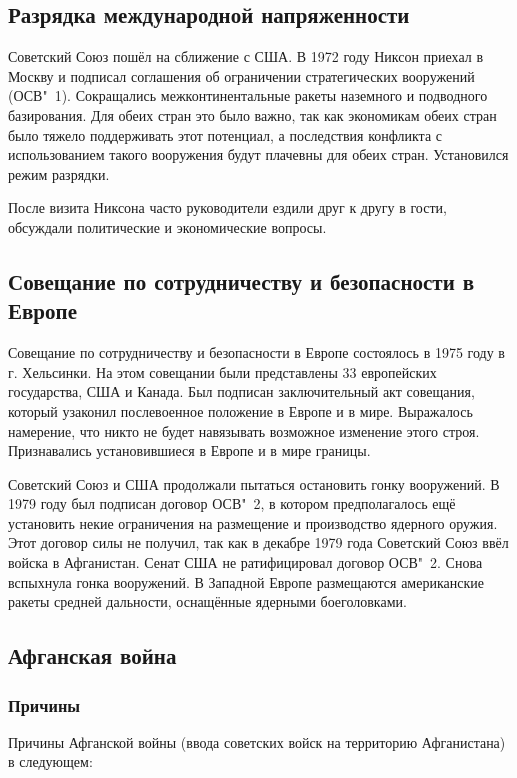     \subsection{Разрядка международной напряженности}
    
    Советский Союз пошёл на сближение с США. В 1972 году Никсон приехал в Москву и подписал соглашения об ограничении стратегических вооружений (ОСВ"~1). Сокращались межконтинентальные ракеты наземного и подводного базирования. Для обеих стран это было важно, так как экономикам обеих стран было тяжело поддерживать этот потенциал, а последствия конфликта с использованием такого вооружения будут плачевны для обеих стран. Установился режим разрядки.
    
    После визита Никсона часто руководители ездили друг к другу в гости, обсуждали политические и экономические вопросы.

    \subsection{Совещание по сотрудничеству и безопасности в Европе}
    
    Совещание по сотрудничеству и безопасности в Европе состоялось в 1975 году в г. Хельсинки. На этом совещании были представлены 33 европейских государства, США и Канада. Был подписан заключительный акт совещания, который узаконил послевоенное положение в Европе и в мире. Выражалось намерение, что никто не будет навязывать возможное изменение этого строя. Признавались установившиеся в Европе и в мире границы.
    
    Советский Союз и США продолжали пытаться остановить гонку вооружений. В 1979 году был подписан договор ОСВ"~2, в котором предполагалось ещё установить некие ограничения на размещение и производство ядерного оружия. Этот договор силы не получил, так как в декабре 1979 года Советский Союз ввёл войска в Афганистан. Сенат США не ратифицировал договор ОСВ"~2. Снова вспыхнула гонка вооружений. В Западной Европе размещаются американские ракеты средней дальности, оснащённые ядерными боеголовками.

    \subsection{Афганская война}

    \subsubsection{Причины}
    Причины Афганской войны (ввода советских войск на территорию Афганистана) в следующем:

